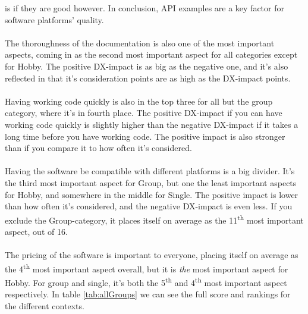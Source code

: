 \documentclass{cslthse-msc}
\begin{document}
    is if they are good however. In conclusion, API examples are a key
    factor for software platforms' quality.
    \\ \\
    The thoroughness of the documentation is also one of the most important
    aspects, coming in as the second most important aspect for all
    categories except for Hobby. The positive DX-impact is as big as the
    negative one, and it's also reflected in that it's consideration points
    are as high as the DX-impact points.
    \\ \\
    Having working code quickly is also in the top three for all but the
    group category, where it's in fourth place. The positive DX-impact if
    you can have working code quickly is slightly higher than the negative
    DX-impact if it takes a long time before you have working code. The
    positive impact is also stronger than if you compare it to how often
    it's considered.
    \\ \\
    Having the software be compatible with different platforms is a big
    divider. It's the third most important aspect for Group, but one the
    least important aspects for Hobby, and somewhere in the middle for
    Single. The positive impact is lower than how often it's considered, and
    the negative DX-impact is even less. If you exclude the Group-category,
    it places itself on average as the 11\textsuperscript{th} most important
    aspect, out of 16.
    \\ \\
    The pricing of the software is important to everyone, placing itself on
    average as the 4\textsuperscript{th} most important aspect overall, but it is \textit{the}
    most important aspect for Hobby. For group and single, it's both the
    5\textsuperscript{th}  and 4\textsuperscript{th}  most important aspect respectively. In table \ref{tab:allGroups} we can see the full score and rankings for the different contexts.
\end{document}
